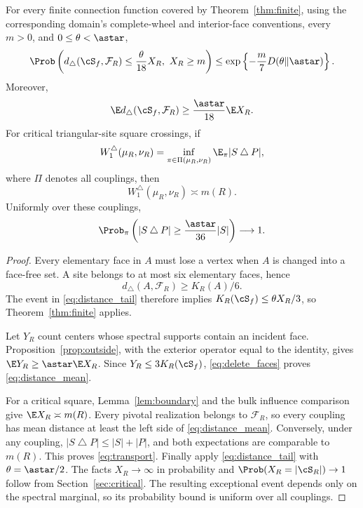 \begin{theorem}\label{thm:distance}
For every finite connection function covered by Theorem~\ref{thm:finite}, using the corresponding domain's complete-wheel and interior-face conventions, every $m>0$, and $0\le\theta<\astar$,
\begin{equation}\label{eq:distance_tail}
 \Prob\left(d_\triangle(\cS_f,\mathcal F_R)\le\frac{\theta}{18}X_R,\ X_R\ge m\right)
 \le\exp\left\{-\frac m7D(\theta\Vert\astar)\right\}.
\end{equation}
Moreover,
\begin{equation}\label{eq:distance_mean}
 \E d_\triangle(\cS_f,\mathcal F_R)\ge\frac{\astar}{18}\E X_R.
\end{equation}
For critical triangular-site square crossings, if
\[
 W_1^\triangle(\mu_R,\nu_R)
 =\inf_{\pi\in\Pi(\mu_R,\nu_R)}\E_\pi|S\mathbin\triangle P|,
\]
where $\Pi$ denotes all couplings, then
\begin{equation}\label{eq:transport}
 W_1^\triangle(\mu_R,\nu_R)\asymp m(R).
\end{equation}
Uniformly over these couplings,
\begin{equation}\label{eq:coupling_distance}
 \Prob_\pi\left(|S\mathbin\triangle P|\ge\frac{\astar}{36}|S|\right)\longrightarrow1.
\end{equation}
\end{theorem}
\begin{proof}
Every elementary face in $A$ must lose a vertex when $A$ is changed into a face-free set. A site belongs to at most six elementary faces, hence
\begin{equation}\label{eq:delete_faces}
 d_\triangle(A,\mathcal F_R)\ge K_R(A)/6.
\end{equation}
The event in \eqref{eq:distance_tail} therefore implies $K_R(\cS_f)\le\theta X_R/3$, so Theorem~\ref{thm:finite} applies.

Let $Y_R$ count centers whose spectral supports contain an incident face. Proposition~\ref{prop:outside}, with the exterior operator equal to the identity, gives $\E Y_R\ge\astar\E X_R$. Since $Y_R\le3K_R(\cS_f)$, \eqref{eq:delete_faces} proves \eqref{eq:distance_mean}.

For a critical square, Lemma~\ref{lem:boundary} and the bulk influence comparison give $\E X_R\asymp m(R)$. Every pivotal realization belongs to $\mathcal F_R$, so every coupling has mean distance at least the left side of \eqref{eq:distance_mean}. Conversely, under any coupling, $|S\mathbin\triangle P|\le|S|+|P|$, and both expectations are comparable to $m(R)$. This proves \eqref{eq:transport}. Finally apply \eqref{eq:distance_tail} with $\theta=\astar/2$. The facts $X_R\to\infty$ in probability and $\Prob(X_R=|\cS_R|)\to1$ follow from Section~\ref{sec:critical}. The resulting exceptional event depends only on the spectral marginal, so its probability bound is uniform over all couplings.
\end{proof}

